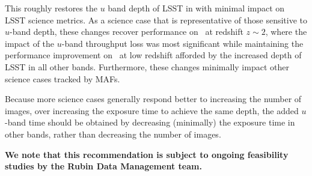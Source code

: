 This roughly restores the $u$ band depth of LSST in  with minimal impact on LSST science metrics. As a science case that is representative of those sensitive to $u$-band depth, these changes recover performance on \pz\ at redshift $z\sim2$, where the impact of the $u$-band throughput loss was most significant while maintaining the performance improvement on \pz\ at low redshift afforded by the increased depth of LSST in all other bands. Furthermore, these changes minimally impact other science cases tracked by MAFs. 

Because more science cases generally respond better to increasing the number of images, over increasing the exposure time to achieve the same depth, the added $u$-band time should be obtained by decreasing (minimally) the exposure time in other bands, rather than decreasing the number of images.

\textbf{ We note that this recommendation is subject to ongoing feasibility studies by the Rubin Data 
Management team.}

